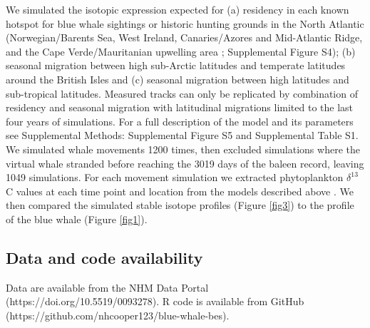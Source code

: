 \documentclass[9pt,twocolumn,twoside,lineno]{pnas-new}
\begin{document}
{We simulated the isotopic expression expected for (a) residency in each known hotspot for blue whale sightings or historic hunting grounds in the North Atlantic (Norwegian/Barents Sea, West Ireland, Canaries/Azores and Mid-Atlantic Ridge, and the Cape Verde/Mauritanian upwelling area \cite{mcdonald2006biogeographic,reilly2008balaenoptera,sigurjonsson1995life}; Supplemental Figure S4); (b) seasonal migration between high sub-Arctic latitudes and temperate latitudes around the British Isles and (c) seasonal migration between high latitudes and sub-tropical latitudes. 
Measured tracks can only be replicated by combination of residency and seasonal migration with latitudinal migrations limited to the last four years of simulations.
For a full description of the model and its parameters see Supplemental Methods: Supplemental Figure S5 and Supplemental Table S1. 
We simulated whale movements 1200 times, then excluded simulations where the virtual whale stranded before reaching the 3019 days of the baleen record, leaving 1049 simulations.
For each movement simulation we extracted phytoplankton $\delta^{13}$C values at each time point and location from the models described above \cite{magozzi2017using}. 
We then compared the simulated stable isotope profiles (Figure \ref{fig3}) to the profile of the blue whale (Figure \ref{fig1}).
 
\subsection*{Data and code availability}
Data are available from the NHM Data Portal (https://doi.org/10.5519/0093278). 
R code is available from GitHub (https://github.com/nhcooper123/blue-whale-bes). 
}

\showmatmethods %


\showacknow %



\end{document}
